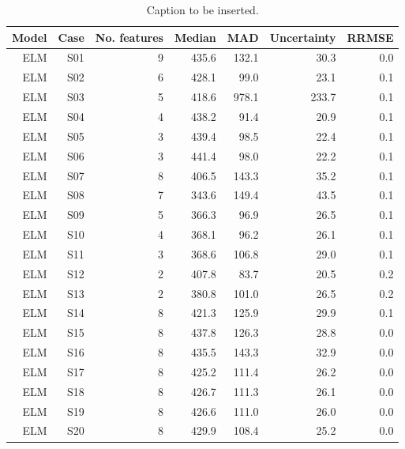 \begin{table}
\centering
\caption{Caption to be inserted.}
\label{uncertainty_table__mc}
\begin{tabular}{rrrrrrr}
\toprule
Model & Case &  No. features &  Median &   MAD &  Uncertainty &  RRMSE \\
\midrule
  ELM &  S01 &             9 &   435.6 & 132.1 &         30.3 &    0.0 \\
  ELM &  S02 &             6 &   428.1 &  99.0 &         23.1 &    0.1 \\
  ELM &  S03 &             5 &   418.6 & 978.1 &        233.7 &    0.1 \\
  ELM &  S04 &             4 &   438.2 &  91.4 &         20.9 &    0.1 \\
  ELM &  S05 &             3 &   439.4 &  98.5 &         22.4 &    0.1 \\
  ELM &  S06 &             3 &   441.4 &  98.0 &         22.2 &    0.1 \\
  ELM &  S07 &             8 &   406.5 & 143.3 &         35.2 &    0.1 \\
  ELM &  S08 &             7 &   343.6 & 149.4 &         43.5 &    0.1 \\
  ELM &  S09 &             5 &   366.3 &  96.9 &         26.5 &    0.1 \\
  ELM &  S10 &             4 &   368.1 &  96.2 &         26.1 &    0.1 \\
  ELM &  S11 &             3 &   368.6 & 106.8 &         29.0 &    0.1 \\
  ELM &  S12 &             2 &   407.8 &  83.7 &         20.5 &    0.2 \\
  ELM &  S13 &             2 &   380.8 & 101.0 &         26.5 &    0.2 \\
  ELM &  S14 &             8 &   421.3 & 125.9 &         29.9 &    0.1 \\
  ELM &  S15 &             8 &   437.8 & 126.3 &         28.8 &    0.0 \\
  ELM &  S16 &             8 &   435.5 & 143.3 &         32.9 &    0.0 \\
  ELM &  S17 &             8 &   425.2 & 111.4 &         26.2 &    0.0 \\
  ELM &  S18 &             8 &   426.7 & 111.3 &         26.1 &    0.0 \\
  ELM &  S19 &             8 &   426.6 & 111.0 &         26.0 &    0.0 \\
  ELM &  S20 &             8 &   429.9 & 108.4 &         25.2 &    0.0 \\

\end{tabular}
\end{table}
